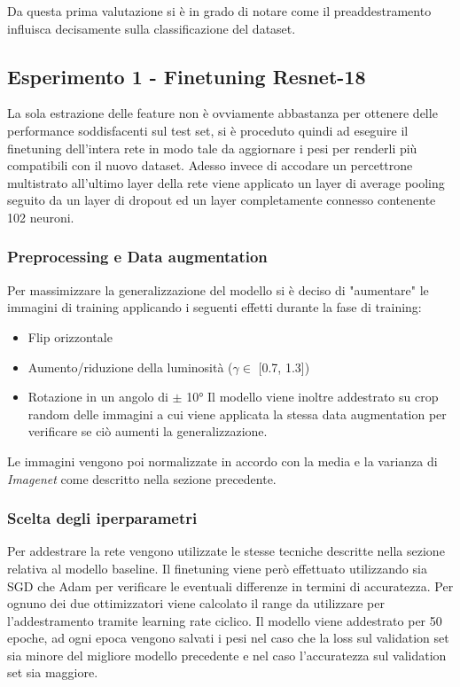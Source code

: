 Da questa prima valutazione si è in grado di notare come il preaddestramento influisca decisamente sulla classificazione del dataset.
\subsection{Esperimento 1 - Finetuning Resnet-18}
La sola estrazione delle feature non è ovviamente abbastanza per ottenere delle performance soddisfacenti sul test set, si è proceduto quindi ad eseguire il finetuning dell'intera rete in modo tale da aggiornare i pesi per renderli più compatibili con il nuovo dataset.
Adesso invece di accodare un percettrone multistrato all'ultimo layer della rete viene applicato un layer di average pooling seguito da un layer di dropout ed un layer completamente connesso contenente 102 neuroni.
\subsubsection{Preprocessing e Data augmentation}
Per massimizzare la generalizzazione del modello si è deciso di "aumentare" le immagini di training applicando i seguenti effetti durante la fase di training:
\begin{itemize}
\item Flip orizzontale
\item Aumento/riduzione della luminosità ($ \gamma \in $ [0.7, 1.3])
\item Rotazione in un angolo di $\pm$ 10°
Il modello viene inoltre addestrato su crop random delle immagini a cui viene applicata la stessa data augmentation per verificare se ciò aumenti la generalizzazione.
\end{itemize}
Le immagini vengono poi normalizzate in accordo con la media e la varianza di \textit{Imagenet} come descritto nella sezione precedente.
\subsubsection{Scelta degli iperparametri}
Per addestrare la rete vengono utilizzate le stesse tecniche descritte nella sezione relativa al modello baseline. Il finetuning viene però effettuato utilizzando sia SGD che Adam \cite{kingma2014adam} per verificare le eventuali differenze in termini di accuratezza.
Per ognuno dei due ottimizzatori viene calcolato il range da utilizzare per l'addestramento tramite learning rate ciclico.
Il modello viene addestrato per 50 epoche, ad ogni epoca vengono salvati i pesi nel caso che la loss sul validation set sia minore del migliore modello precedente e nel caso l'accuratezza sul validation set sia maggiore.
